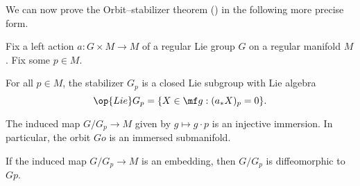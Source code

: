 \documentclass[../notes.tex]{subfiles}
\begin{document}
We can now prove the Orbit--stabilizer theorem () in the following more precise form.
\begin{theorem} \label{thm:orbit-stabilizer-lie-algebra}
	Fix a left action $a\colon G\times M\to M$ of a regular Lie group $G$ on a regular manifold $M$. Fix some $p\in M$.
	\begin{listalph}
		\item For all $p\in M$, the stabilizer $G_p$ is a closed Lie subgroup with Lie algebra
		\[\op{Lie}G_p=\{X\in\mf g:(a_*X)_p=0\}.\]
		\item The induced map $G/G_p\to M$ given by $g\mapsto g\cdot p$ is an injective immersion. In particular, the orbit $Go$ is an immersed submanifold.
		\item If the induced map $G/G_p\to M$ is an embedding, then $G/G_p$ is diffeomorphic to $Gp$.
	\end{listalph}
\end{theorem}
\end{document}

